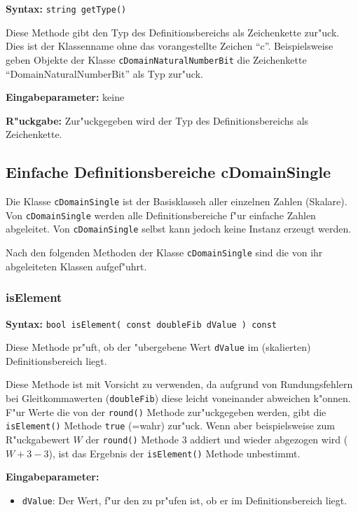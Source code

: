 \textbf{Syntax:} \verb|string getType()|

\bigskip\noindent
Diese Methode gibt den Typ des Definitionsbereichs als Zeichenkette zur"uck. Dies ist der Klassenname ohne das vorangestellte Zeichen ``c''. Beispielsweise geben Objekte der Klasse \verb|cDomainNaturalNumberBit| die Zeichenkette ``DomainNaturalNumberBit'' als Typ zur"uck.

\bigskip\noindent
\textbf{Eingabeparameter:} keine

\bigskip\noindent
\textbf{R"uckgabe:} Zur"uckgegeben wird der Typ des Definitionsbereichs als Zeichenkette.



\subsection{Einfache Definitionsbereiche cDomainSingle}

Die Klasse \verb|cDomainSingle| ist der Basisklasseh aller einzelnen Zahlen (Skalare). Von \verb|cDomainSingle| werden alle Definitionsbereiche f"ur einfache Zahlen abgeleitet. Von \verb|cDomainSingle| selbst kann jedoch keine Instanz erzeugt werden.

Nach den folgenden Methoden der Klasse \verb|cDomainSingle| sind die von ihr abgeleiteten Klassen aufgef"uhrt.


\subsubsection{isElement}

\textbf{Syntax:} \verb|bool isElement( const doubleFib dValue ) const|

\bigskip\noindent
Diese Methode pr"uft, ob der "ubergebene Wert \verb|dValue| im (skalierten) Definitionsbereich liegt.

Diese Methode ist mit Vorsicht zu verwenden, da aufgrund von Rundungsfehlern bei Gleitkommawerten (\verb|doubleFib|) diese leicht voneinander abweichen k"onnen. F"ur Werte die von der \verb|round()| Methode zur"uckgegeben werden, gibt die \verb|isElement()| Methode \verb|true| (=wahr) zur"uck. Wenn aber beispielsweise zum R"uckgabewert $W$ der \verb|round()| Methode $3$ addiert und wieder abgezogen wird ($W+3-3$), ist das Ergebnis der \verb|isElement()| Methode unbestimmt.

\bigskip\noindent
\textbf{Eingabeparameter:}
\begin{itemize}
 \item \verb|dValue|: Der Wert, f"ur den zu pr"ufen ist, ob er im Definitionsbereich liegt.
\end{itemize}


